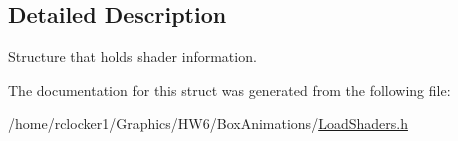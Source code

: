 \subsection{Detailed Description}
Structure that holds shader information. 

The documentation for this struct was generated from the following file\+:\begin{DoxyCompactItemize}
\item 
/home/rclocker1/\+Graphics/\+H\+W6/\+Box\+Animations/\hyperlink{_load_shaders_8h}{Load\+Shaders.\+h}\end{DoxyCompactItemize}
